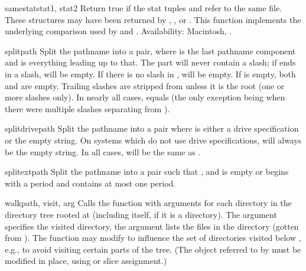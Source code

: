 \begin{funcdesc}{samestat}{stat1, stat2}
Return true if the stat tuples  and  refer to
the same file.  These structures may have been returned by
, , or .  This
function implements the underlying comparison used by
 and .
Availability:  Macintosh, \UNIX{}.
\end{funcdesc}

\begin{funcdesc}{split}{path}
Split the pathname  into a pair,  where  is the last pathname component and
 is everything leading up to that.  The  part will
never contain a slash; if  ends in a slash,  will
be empty.  If there is no slash in ,  will be
empty.  If  is empty, both  and  are
empty.  Trailing slashes are stripped from  unless it is the
root (one or more slashes only).  In nearly all cases,
 equals  (the only
exception being when there were multiple slashes separating 
from ).
\end{funcdesc}

\begin{funcdesc}{splitdrive}{path}
Split the pathname  into a pair  where  is either a drive specification or the
empty string.  On systems which do not use drive specifications,
 will always be the empty string.  In all cases,
 will be the same as .
\end{funcdesc}

\begin{funcdesc}{splitext}{path}
Split the pathname  into a pair  
such that ,
and  is empty or begins with a period and contains
at most one period.
\end{funcdesc}

\begin{funcdesc}{walk}{path, visit, arg}
Calls the function  with arguments
 for each directory in the
directory tree rooted at  (including  itself, if it
is a directory).  The argument  specifies the visited
directory, the argument  lists the files in the directory
(gotten from ).
The  function may modify  to
influence the set of directories visited below , e.g., to
avoid visiting certain parts of the tree.  (The object referred to by
 must be modified in place, using  or slice
assignment.)
\end{funcdesc}
